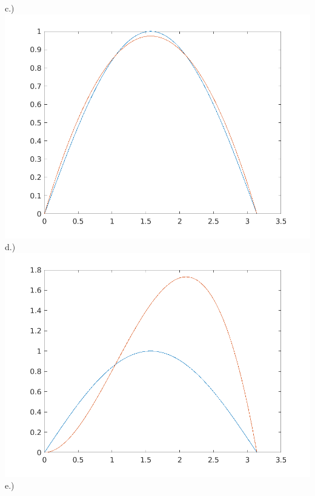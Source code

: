 \documentclass[12pt]{article}
\theoremstyle{homework}
\begin{document}
c.)\newline
\includegraphics[scale=0.45]{sinelagbetter.png}\newline
d.)\newline
\includegraphics[scale=0.45]{sinelag.png}\newline
e.)\newline
\end{document}
